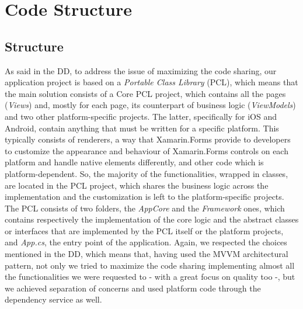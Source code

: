 \chapter{Code Structure}
\label{cha:structure}
\section{Structure}
As said in the DD, to address the issue of maximizing the code sharing, our application project is based on a \textit{Portable Class Library} (PCL), which means that the main solution consists of a Core PCL project, which contains all the pages (\textit{Views}) and, mostly for each page, its counterpart of business logic (\textit{ViewModels}) and two other platform-specific projects. The latter, specifically for iOS and Android, contain anything that must be written for a specific platform. This typically consists of renderers, a way that Xamarin.Forms provide to developers to customize the appearance and behaviour of Xamarin.Forms controls on each platform and handle native elements differently, and other code which is platform-dependent. So, the majority of the functionalities, wrapped in classes, are located in the PCL project, which shares the business logic across the implementation and the customization is left to the platform-specific projects. \\

The PCL consists of two folders, the \textit{AppCore} and the \textit{Framework} ones, which contains respectively the implementation of the core logic and the abstract classes or interfaces that are implemented by the PCL itself or the platform projects, and \textit{App.cs}, the entry point of the application. Again, we respected the choices mentioned in the DD, which means that, having used the MVVM architectural pattern, not only we tried to maximize the code sharing implementing almost all the functionalities we were requested to - with a great focus on quality too -, but we achieved separation of concerns and used platform code through the dependency service as well. \\


